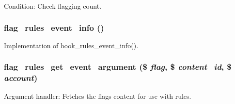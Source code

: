 Condition: Check flagging count. \hypertarget{flag_8rules_8inc_f4819490ed1f860605a31544ab188855}{
\subsubsection[{flag\_\-rules\_\-event\_\-info}]{\setlength{\rightskip}{0pt plus 5cm}flag\_\-rules\_\-event\_\-info ()}}
\label{flag_8rules_8inc_f4819490ed1f860605a31544ab188855}


Implementation of hook\_\-rules\_\-event\_\-info(). \hypertarget{flag_8rules_8inc_fa153ce513fb7e21a85f35bda9d730dd}{
\subsubsection[{flag\_\-rules\_\-get\_\-event\_\-argument}]{\setlength{\rightskip}{0pt plus 5cm}flag\_\-rules\_\-get\_\-event\_\-argument (\$ {\em flag}, \/  \$ {\em content\_\-id}, \/  \$ {\em account})}}
\label{flag_8rules_8inc_fa153ce513fb7e21a85f35bda9d730dd}


Argument handler: Fetches the flags content for use with rules. 